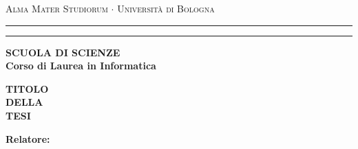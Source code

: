 \documentclass[12pt,a4paper,openright,twoside]{report}
\begin{document}
                                        \begin{titlepage}                       %
                                        \begin{titlepage}
                                        \begin{center}
                                        {{\Large{\textsc{Alma Mater Studiorum $\cdot$ Universit\`a di
                                        Bologna}}}} \rule[0.1cm]{15.8cm}{0.1mm}
                                        \rule[0.5cm]{15.8cm}{0.6mm}
                                        {\small{\bf SCUOLA DI SCIENZE\\
                                        Corso di Laurea in Informatica }}
                                        \end{center}
                                        \vspace{15mm}
                                        \begin{center}
                                        {\LARGE{\bf TITOLO}}\\
                                        \vspace{3mm}
                                        {\LARGE{\bf DELLA}}\\
                                        \vspace{3mm}
                                        {\LARGE{\bf TESI}}\\
                                        \end{center}
                                        \vspace{40mm}
                                        \par
                                        \noindent
                                        \begin{minipage}[t]{0.47\textwidth}
                                        {\large{\bf Relatore:\\
}}
\end{minipage}
\end{titlepage}
\end{titlepage}
\end{document}
